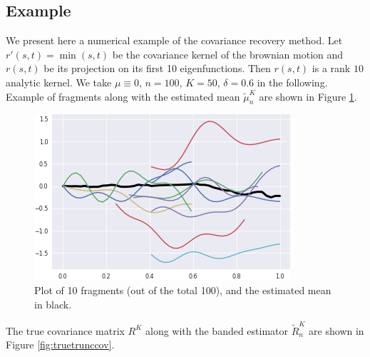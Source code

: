 \documentclass[10pt, a4paper]{report}
\theoremstyle{definition}
\theoremstyle{remark}
\begin{document}
\subsection{Example}
We present here a numerical example of the covariance recovery method. Let $r'(s,t)=\min(s,t)$ be the covariance kernel of the brownian motion and $r(s,t)$ be its projection on its first 10 eigenfunctions. Then $r(s,t)$ is a rank $10$ analytic kernel. We take $\mu \equiv 0$, $n=100$, $K=50$, $\delta=0.6$ in the following. Example of fragments along with the estimated mean $\tilde{\mu}_n^K$ are shown in Figure \ref{fig:fragex}.
\begin{figure}
\centering
\includegraphics[width=0.7\linewidth]{Code/images/24/fragex}
\caption{Plot of 10 fragments (out of the total 100), and the estimated mean in black. }
\label{fig:fragex}
\end{figure}
The true covariance matrix $R^K$ along with the banded estimator $\tilde{R}_n^K$ are shown in Figure \ref{fig:truetrunccov}.
\end{document}
